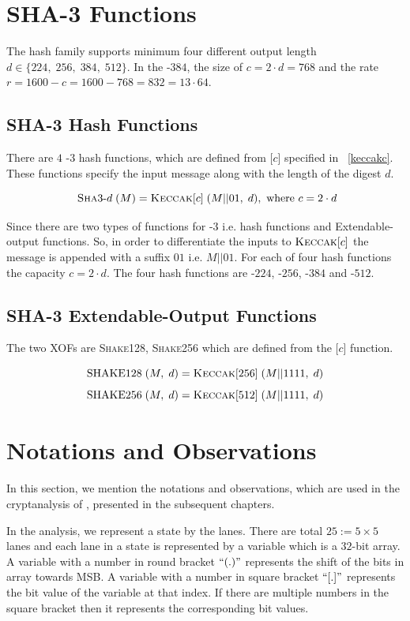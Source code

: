 \section{SHA-3 Functions}

The  hash family supports minimum four different output length $d \in \{224,\;256,\;384,\;512\}$. In the \Keccak-$384$, the size of $c = 2\cdot d = 768$ and the rate $r = 1600 - c = 1600 - 768 = 832 = 13 \cdot 64$.

\subsection{SHA-3 Hash Functions}

There are $4$ \SHA-$3$ hash functions, which are defined from \KECCAK{}[$c$] specified in ~\ref{keccakc}. These functions specify the input message along with the length of the digest $d$.

\[
   \text{ \textsc{Sha}3-}d\;(M) = \mbox{\textsc{Keccak}}{}[c]\;(M||01,\; d), \text{ where } c = 2 \cdot d
\]

Since there are two types of functions for \SHA-$3$ i.e. hash functions and Extendable-output functions. So, in order to differentiate the inputs to $\mbox{\textsc{Keccak}}{}[c]$ the message is appended with a suffix $01$ i.e. $M||01$. For each of four hash functions the capacity $c = 2\cdot d$. The four hash functions are -$224$, -$256$, -$384$ and -$512$.

\subsection{SHA-3 Extendable-Output Functions}

The two  XOFs are \textsc{Shake}128, \textsc{Shake}256 which are defined from the \KECCAK{}[$c$] function.

\[
    \text{SHAKE}128\;(M,\;d) = \mbox{\textsc{Keccak}}{}[256]\;(M||1111,\; d)
\]
\[
    \text{SHAKE}256\;(M,\;d) = \mbox{\textsc{Keccak}}{}[512]\;(M||1111,\; d)
\]

\section{Notations and Observations}
In this section, we mention the notations and observations, which are used in the cryptanalysis of \KECCAK{}, presented in the subsequent chapters.

In the analysis, we represent a \KECCAK{} state by the lanes. There are 
 total $25:=5 \times 5$ lanes and each lane in a state is represented by a
 variable which is a $32$-bit array. 
A variable with a number in round bracket $``( . )"$ represents the shift of the bits in array towards MSB. A variable with a number in square bracket $``[ . ]"$ represents the bit value of the variable at that index. If there are multiple numbers in the square bracket then it represents the corresponding bit values.


